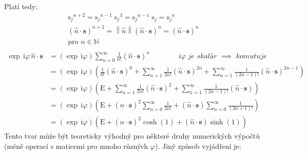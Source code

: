 \documentclass[10pt,a4paper]{article}
\newcommand{\const}[1]{\text{#1}}
\newcommand{\norm}[1]{\left\lVert#1\right\rVert}
\renewcommand{\i}{\const{i}}
\begin{document}
Platí tedy:
\begin{gather*}
    {\const{s}_j}^{n+2} =
    {\const{s}_j}^{n-1} \;
    {\const{s}_j}^3 =
    {\const{s}_j}^{n-1} \;
    {\const{s}_j} =
    {\const{s}_j}^n
    \\
    \left(\hat{n} \cdot \mathbf{s}\right)^{n+2} =
    \norm{\hat{n}} \left(\hat{n} \cdot \mathbf{s}\right)^n =
    \left(\hat{n} \cdot \mathbf{s}\right)^n
    \\
    \text{pro } n \in \mathbb{N}
    \\
\end{gather*}
\begin{align*}
    \exp \, \i \varphi \,
    \hat{n} \cdot \mathbf{s}
    &=
    \left(\exp \, \i \varphi\right)
    \sum_{n=0}^\infty
    \frac{1}{n!}
    \left(\hat{n} \cdot \mathbf{s}\right)^n
    \hspace{4em}
    \boxed{\textit{$i\varphi$ je skalár $\implies$ komutuje}}
    \\
    &=
    \left(\exp \, \i \varphi\right)
    \left(
        \frac{1}{0!}
        \left(\hat{n} \cdot \mathbf{s}\right)^0
        +
        \sum_{n=1}^\infty
        \frac{1}{2n!}
        \left(\hat{n} \cdot \mathbf{s}\right)^{2n}
        +
        \sum_{n=1}^\infty
        \frac{1}{(2n-1)!}
        \left(\hat{n} \cdot \mathbf{s}\right)^{2n-1}
    \right)
    \\
    &=
    \left(\exp \, \i \varphi\right)
    \left(
        \const{E}
        +
        \sum_{n=1}^\infty
        \frac{1}{2n!}
        \left(\hat{n} \cdot \mathbf{s}\right)^2
        +
        \sum_{n=1}^\infty
        \frac{1}{(2n-1)!}
        \left(\hat{n} \cdot \mathbf{s}\right)
    \right)
    \\
    &=
    \left(\exp \, \i \varphi\right)
    \left(
        \const{E}
        +
        \left(\hat{n} \cdot \mathbf{s}\right)^2
        \sum_{n=0}^\infty
        \frac{1}{2n!}
        +
        \left(\hat{n} \cdot \mathbf{s}\right)
        \sum_{n=0}^\infty
        \frac{1}{(2n+1)!}
    \right)
    \\
    &=
    \left(\exp \, \i \varphi\right)
    \left(
        \const{E}
        +
        \left(\hat{n} \cdot \mathbf{s}\right)^2
        \cosh(1)
        +
        \left(\hat{n} \cdot \mathbf{s}\right)
        \sinh(1)
    \right)
\end{align*}
Tento tvar může být teoreticky výhodný pro některé druhy numerických výpočtů (méně operací s maticemi pro mnoho různých $\varphi$). Jiný způsob vyjádření je:
\end{document}
